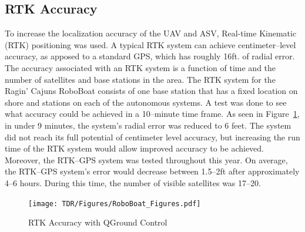 \documentclass[letterpaper, 12 pt, conference]{ieeeconf}
\begin{document}
% 
\subsection{RTK Accuracy} 
% 
To increase the localization accuracy of the UAV and ASV, Real-time Kinematic (RTK) positioning was used. A typical RTK system can achieve centimeter--level accuracy, as apposed to a standard GPS, which has roughly 16ft. of radial error. The accuracy associated with an RTK system is a function of time and the number of satellites and base stations in the area. The RTK system for the Ragin' Cajuns RoboBoat consists of one base station that has a fixed location on shore and stations on each of the autonomous systems. A test was done to see what accuracy could be achieved in a 10--minute time frame. As seen in Figure~\ref{fig:RTK}, in under 9 minutes, the system's radial error was reduced to 6 feet. The system did not reach its full potential of centimeter level accuracy, but increasing the run time of the RTK system would allow improved accuracy to be achieved. Moreover, the RTK--GPS system was tested throughout this year. On average, the RTK--GPS system's error would decrease between 1.5--2ft after approximately 4--6 hours. During this time, the number of visible satellites was 17--20.
%
\begin{figure}[tb]
\vspace{0.05in}
\centering
\texttt{[image: TDR/Figures/RoboBoat\_Figures.pdf]}
\caption{RTK Accuracy with QGround Control}
\label{fig:RTK}
\end{figure}
% 
\end{document}
